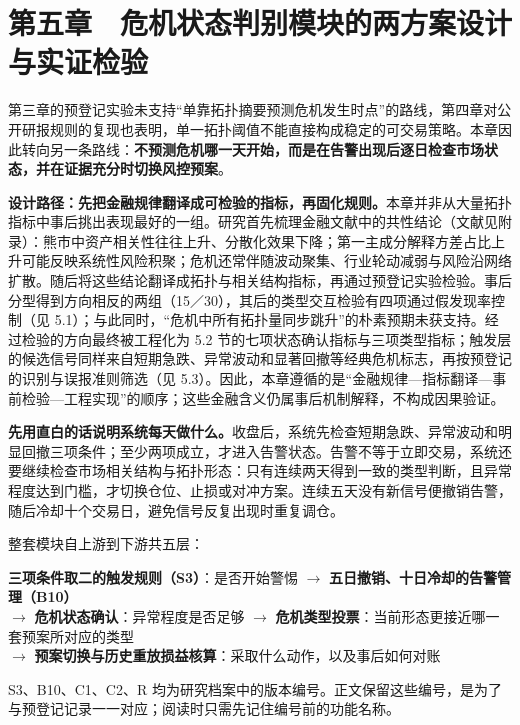 \documentclass[12pt,a4paper]{ctexart}
\begin{document}
\section{第五章　危机状态判别模块的两方案设计与实证检验}
第三章的预登记实验未支持“单靠拓扑摘要预测危机发生时点”的路线，第四章对公开研报规则的复现也表明，单一拓扑阈值不能直接构成稳定的可交易策略。本章因此转向另一条路线：\textbf{不预测危机哪一天开始，而是在告警出现后逐日检查市场状态，并在证据充分时切换风控预案}。\par
\textbf{设计路径：先把金融规律翻译成可检验的指标，再固化规则。}本章并非从大量拓扑指标中事后挑出表现最好的一组。研究首先梳理金融文献中的共性结论（文献见附录）：熊市中资产相关性往往上升、分散化效果下降；第一主成分解释方差占比上升可能反映系统性风险积聚；危机还常伴随波动聚集、行业轮动减弱与风险沿网络扩散。随后将这些结论翻译成拓扑与相关结构指标，再通过预登记实验检验。事后分型得到方向相反的两组（15／30），其后的类型交互检验有四项通过假发现率控制（见 5.1）；与此同时，“危机中所有拓扑量同步跳升”的朴素预期未获支持。经过检验的方向最终被工程化为 5.2 节的七项状态确认指标与三项类型指标；触发层的候选信号同样来自短期急跌、异常波动和显著回撤等经典危机标志，再按预登记的识别与误报准则筛选（见 5.3）。因此，本章遵循的是“金融规律—指标翻译—事前检验—工程实现”的顺序；这些金融含义仍属事后机制解释，不构成因果验证。\par
\textbf{先用直白的话说明系统每天做什么。}收盘后，系统先检查短期急跌、异常波动和明显回撤三项条件；至少两项成立，才进入告警状态。告警不等于立即交易，系统还要继续检查市场相关结构与拓扑形态：只有连续两天得到一致的类型判断，且异常程度达到门槛，才切换仓位、止损或对冲方案。连续五天没有新信号便撤销告警，随后冷却十个交易日，避免信号反复出现时重复调仓。\par
整套模块自上游到下游共五层：
\begin{center}\small
\textbf{三项条件取二的触发规则（S3）}：是否开始警惕 \(\rightarrow\) \textbf{五日撤销、十日冷却的告警管理（B10）}\\
\(\rightarrow\) \textbf{危机状态确认}：异常程度是否足够 \(\rightarrow\) \textbf{危机类型投票}：当前形态更接近哪一套预案所对应的类型\\
\(\rightarrow\) \textbf{预案切换与历史重放损益核算}：采取什么动作，以及事后如何对账
\end{center}
S3、B10、C1、C2、R 均为研究档案中的版本编号。正文保留这些编号，是为了与预登记记录一一对应；阅读时只需先记住编号前的功能名称。\par
\end{document}
